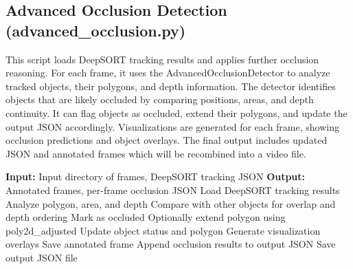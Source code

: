 \documentclass[12pt,a4paper]{report}
\theoremstyle{definition}
\theoremstyle{remark}
\begin{document}
\subsection{Advanced Occlusion Detection (advanced\_occlusion.py)}
This script loads DeepSORT tracking results and applies further occlusion reasoning. For each frame, it uses the AdvancedOcclusionDetector to analyze tracked objects, their polygons, and depth information. The detector identifies objects that are likely occluded by comparing positions, areas, and depth continuity. It can flag objects as occluded, extend their polygons, and update the output JSON accordingly. Visualizations are generated for each frame, showing occlusion predictions and object overlays. The final output includes updated JSON and annotated frames which will be recombined into a video file.

\begin{algorithm}[H]
\caption{Advanced Occlusion Detection and Visualization}
\label{alg:occlusion}
\begin{algorithmic}[1]
\State \textbf{Input:} Input directory of frames, DeepSORT tracking JSON
\State \textbf{Output:} Annotated frames, per-frame occlusion JSON
\State Load DeepSORT tracking results
        \State Analyze polygon, area, and depth
        \State Compare with other objects for overlap and depth ordering
            \State Mark as occluded
            \State Optionally extend polygon using poly2d\_adjusted
        \EndIf
        \State Update object status and polygon
    \EndFor
    \State Generate visualization overlays
    \State Save annotated frame
    \State Append occlusion results to output JSON
\EndFor
\State Save output JSON file
\end{algorithmic}
\end{algorithm}
\end{document}
